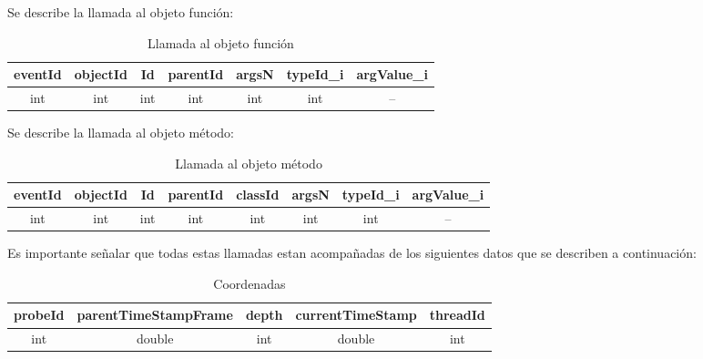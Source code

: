 \documentclass[10pt,a4paper]{article}
\begin{document}
Se describe la llamada al objeto función:\\

\begin{table}[!h]
\begin{center}
\begin{tabular}{| c | c | c | c | c | c | c |}
\hline
eventId & objectId & Id & parentId & argsN & typeId_{i} & argValue_{i}\\
\hline
int & int & int & int & int & int & --\footnotemark[1]\\
\hline
\end{tabular}
\caption{Llamada al objeto función} 
\end{center}
\end{table}

Se describe la llamada al objeto método:\\

\begin{table}[!h]
\begin{center}
\begin{tabular}{| c | c | c | c | c | c | c | c |}
\hline
eventId & objectId & Id & parentId & classId & argsN & typeId_{i} & argValue_{i}\\
\hline
int & int & int & int & int & int & int & --\footnotemark[1]\\
\hline
\end{tabular}
\caption{Llamada al objeto método} 
\end{center}
\end{table}

Es importante señalar que todas estas llamadas estan acompañadas de los siguientes datos que se describen a continuación:\\

\begin{table}[!h]
\begin{center}
\begin{tabular}{| c | c | c | c | c |}
\hline
probeId & parentTimeStampFrame & depth & currentTimeStamp & threadId\\
\hline
int & double & int & double & int \\
\hline
\end{tabular}
\caption{Coordenadas} 
\end{center}
\end{table}


\newpage
\end{document}
